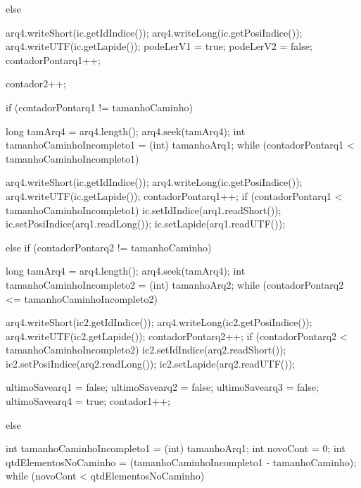 {{{{{{{                  } else {
                    arq4.writeShort(ic.getIdIndice());
                    arq4.writeLong(ic.getPosiIndice());
                    arq4.writeUTF(ic.getLapide());
                    podeLerV1 = true;
                    podeLerV2 = false;
                    contadorPontarq1++;

                  }

                  contador2++;
                }

                if (contadorPontarq1 != tamanhoCaminho) {
                  long tamArq4 = arq4.length();
                  arq4.seek(tamArq4);
                  int tamanhoCaminhoIncompleto1 = (int) tamanhoArq1;
                  while (contadorPontarq1 < tamanhoCaminhoIncompleto1) {
                    arq4.writeShort(ic.getIdIndice());
                    arq4.writeLong(ic.getPosiIndice());
                    arq4.writeUTF(ic.getLapide());
                    contadorPontarq1++;
                    if (contadorPontarq1 < tamanhoCaminhoIncompleto1) {
                      ic.setIdIndice(arq1.readShort());
                      ic.setPosiIndice(arq1.readLong());
                      ic.setLapide(arq1.readUTF());
                    }

                  }

                } else if (contadorPontarq2 != tamanhoCaminho) {

                  long tamArq4 = arq4.length();
                  arq4.seek(tamArq4);
                  int tamanhoCaminhoIncompleto2 = (int) tamanhoArq2;
                  while (contadorPontarq2 <= tamanhoCaminhoIncompleto2) {
                    arq4.writeShort(ic2.getIdIndice());
                    arq4.writeLong(ic2.getPosiIndice());
                    arq4.writeUTF(ic2.getLapide());
                    contadorPontarq2++;
                    if (contadorPontarq2 < tamanhoCaminhoIncompleto2) {
                      ic2.setIdIndice(arq2.readShort());
                      ic2.setPosiIndice(arq2.readLong());
                      ic2.setLapide(arq2.readUTF());
                    }

                  }
                }
                ultimoSavearq1 = false;
                ultimoSavearq2 = false;
                ultimoSavearq3 = false;
                ultimoSavearq4 = true;
                contador1++;
              } else {
                int tamanhoCaminhoIncompleto1 = (int) tamanhoArq1;
                int novoCont = 0;
                int qtdElementosNoCaminho = (tamanhoCaminhoIncompleto1 - tamanhoCaminho);
                while (novoCont < qtdElementosNoCaminho) {

}}}}}}
